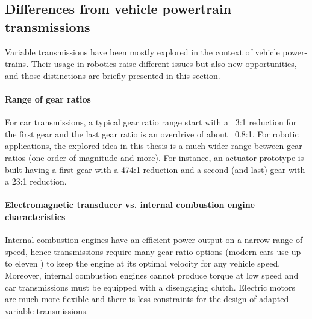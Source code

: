 

\subsection{Differences from vehicle powertrain transmissions}

Variable transmissions have been mostly explored in the context of vehicle power-trains. Their usage in robotics raise different issues but also new opportunities, and those distinctions are briefly presented in this section.

\paragraph{Range of gear ratios}
%
For car transmissions, a typical gear ratio range start with a ~3:1 reduction for the first gear and the last gear ratio is an overdrive of about ~0.8:1. For robotic applications, the explored idea in this thesis is a much wider range between gear ratios (one order-of-magnitude and more). For instance, an actuator prototype is built having a first gear with a 474:1 reduction and a second (and last) gear with a 23:1 reduction. 


\paragraph{Electromagnetic transducer vs. internal combustion engine characteristics}
%
Internal combustion engines have an efficient power-output on a narrow range of speed, hence transmissions require many gear ratio options (modern cars use up to eleven \cite{goleski_multi-speed_2015}) to keep the engine at its optimal velocity for any vehicle speed. Moreover, internal combustion engines cannot produce torque at low speed and car transmissions must be equipped with a disengaging clutch.  Electric motors are much more flexible and there is less constraints for the design of adapted variable transmissions. 

